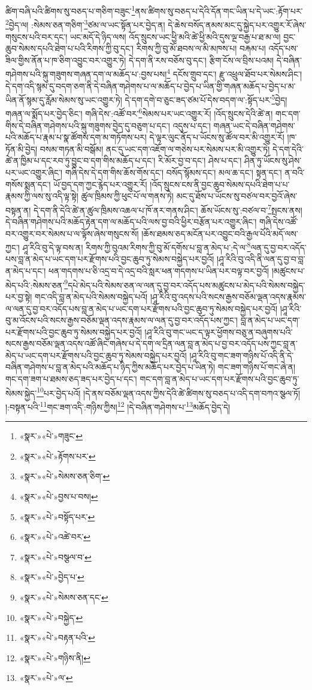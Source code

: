 ཚིག་བཞི་པའི་ཚིགས་སུ་བཅད་པ་གཅིག་བཟུང་\footnote{«སྣར་»«པེ་»གཟུང་}ནས་ཚིགས་སུ་བཅད་པ་དེའི་དོན་གང་ཡིན་པ་དེ་ཡང་:རྟོག་པར་\footnote{«སྣར་»«པེ་»རྟོགས་པར་}བྱེད་ལ། :སེམས་ཅན་གཅིག་\footnote{«སྣར་»«པེ་»སེམས་ཅན་ཅིག་}ཙམ་ལ་ཡང་སྟོན་པར་བྱེད་ན། དེ་ཆེས་བསོད་ནམས་མང་དུ་སྐྱེད་པར་འགྱུར་རོ་ཞེས་གསུངས་པའི་བར་དང་། ཡང་མདོ་དེ་ཉིད་ལས། འོད་སྲུངས་ཡང་ཕྱི་མའི་ཚེ་ཕྱི་མའི་དུས་ལྔ་བརྒྱ་པ་ཐ་མ་ལ། བྱང་ཆུབ་སེམས་དཔའི་ཐེག་པ་པའི་རིགས་ཀྱི་བུ་དང་། རིགས་ཀྱི་བུ་མོ་ཐབས་ལ་མི་མཁས་པ། བརྐམ་པ། འདོད་པས་ཟིལ་གྱིས་ནོན་པ་ཁ་ཅིག་འབྱུང་བར་འགྱུར་ཏེ། དེ་དག་ནི་རས་བཅོས་བུ་དང་། རྩིག་ངོས་ལ་བྲིས་པའམ། དེ་བཞིན་གཤེགས་པའི་སྐུ་གཟུགས་གཞན་དག་ལ་མཆོད་པ་:བྱས་པས།\footnote{«སྣར་»«པེ་»བྱས་པ་བས།} དངོས་གྲུབ་དང་། རྫུ་འཕྲུལ་ཐོབ་པར་སེམས་ཤིང་། དེ་དག་འདི་སྙམ་དུ་བདག་ཅག་ནི་དེ་བཞིན་གཤེགས་པ་ལ་མཆོད་པ་བྱེད་པ་ཡིན་གྱི་གཞན་མཆོད་པ་བྱེད་པ་མ་ཡིན་ནོ་སྙམ་དུ་རློམ་སེམས་སུ་ཡང་འགྱུར་ཏེ། དེ་དག་དགེ་བ་ཅུང་ཟད་ཙམ་པོ་དེས་བདག་ལ་:སྟོད་པར་\footnote{«སྣར་»«པེ་»བསྟོད་པར་}བྱེད། གཞན་ལ་སྨོད་པར་བྱེད་ཅིང་། གཞི་དེས་:འཚོ་བར་\footnote{«སྣར་»«པེ་»འཚེ་བར་}སེམས་པར་ཡང་འགྱུར་རོ། །འོད་སྲུངས་དེའི་ཚེ་ན། གང་དག་གིས་དེ་བཞིན་གཤེགས་པའི་སྐུ་གཟུགས་བྱེད་དུ་བཅུག་པ་དང་། འདུས་པ་དང་། གཞན་ཡང་དེ་བཞིན་གཤེགས་པའི་མཆོད་པ་རྣམ་པ་སྣ་ཚོགས་དག་མ་གཏོགས་པར། དེ་ལྟར་ལུང་ནོད་པ་ཡོངས་སུ་ཚོལ་བར་མི་འགྱུར་རོ། །ཁ་ཏོན་མི་བྱེད། བསམ་གཏན་མི་བསྒོམ། ནང་དུ་ཡང་དག་འཇོག་ལ་གཅེས་པར་སེམས་པར་མི་འགྱུར་ཏེ། དེ་དག་དེའི་ཚེ་ན་ཁྱིམ་པ་དང་རབ་ཏུ་བྱུང་བ་དག་གིས་མཆོད་པ་དང་། རི་མོར་བྱ་བ་དང་། ཤེས་པ་དང་། ཤིན་ཏུ་ཡོངས་སུ་ཤེས་པར་ཡང་འགྱུར་ཞིང་། གཞི་དེས་དེ་དག་གིས་ཆོས་གོས་དང་། བསོད་སྙོམས་དང་། མལ་ཆ་དང་། སྟན་དང་། ན་བའི་གསོས་སྨན་དང་། ཡོ་བྱད་དག་ཀྱང་རྙེད་པར་འགྱུར་རོ། །འོད་སྲུངས་ངས་ནི་བྱང་ཆུབ་སེམས་དཔའི་ཐེག་པ་པ་རྣམས་ཀྱི་ལས་སུ་འདི་ལྟ་སྟེ། ཚུལ་ཁྲིམས་ཀྱི་ཕུང་པོ་ལ་གནས་ཏེ། མང་དུ་ཐོས་པ་ཡོངས་སུ་བཙལ་བར་བྱའོ་ཞེས་བསྟན་ན། དེ་དག་ནི་དེའི་ཚེ་ན་ཚུལ་ཁྲིམས་འཆལ་པ་ཁོ་ནར་གནས་ཤིང་། ཆོས་ཡོངས་སུ་:བཙལ་བ་\footnote{«སྣར་»«པེ་»བསྩལ་བ་}སྤངས་ནས། དེ་བཞིན་གཤེགས་པའི་མཆོད་རྟེན་དག་ལ་མཆོད་པའི་ལས་བྱ་བའི་ཕྱིར་བརྩོན་པར་འགྱུར་ཞིང་། གཞི་དེས་འཚོ་བར་འགྱུར་བར་སེམས་པ་ལ་ལྟོས་ཞེས་གསུངས་སོ། །ཆོས་ཐམས་ཅད་མངོན་པར་འབྱུང་བའི་རྒྱལ་པོའི་མདོ་ལས་ཀྱང་། ཤཱ་རིའི་བུ་དེ་ལྟ་བས་ན། རིགས་ཀྱི་བུའམ་རིགས་ཀྱི་བུ་མོ་དགོས་པ་བླ་ན་མེད་པ་:དེ་ལ་\footnote{«སྣར་»«པེ་»བྱེད་པ་}ལན་དུ་བྱ་བར་འདོད་པས་བླ་ན་མེད་པ་ཡང་དག་པར་རྫོགས་པའི་བྱང་ཆུབ་ཏུ་སེམས་བསྐྱེད་པར་བྱའོ། །ཤཱ་རིའི་བུ་འདི་ནི་ལན་དུ་བྱ་བ་བླ་ན་མེད་པ་དང་། ཕན་གདགས་པ་ཅི་འདྲ་བ་དེ་འདྲ་བའི་སླར་ཕན་གདགས་པ་ཡིན་པར་བལྟ་བར་བྱའོ། །མཚུངས་པ་མེད་པའི་:སེམས་ཅན་\footnote{«སྣར་»«པེ་»སེམས་ཅན་དང་}དཔེ་མེད་པའི་སེམས་ཅན་ལ་ལན་དུ་བྱ་བར་འདོད་པས་མཚུངས་པ་མེད་པའི་སེམས་བསྐྱེད་པར་བྱ་སྟེ། གང་འདི་བླ་ན་མེད་པའི་སེམས་བསྐྱེད་པའོ། །ཤཱ་རིའི་བུ་འདས་པའི་སངས་རྒྱས་བཅོམ་ལྡན་འདས་རྣམས་ལ་ལན་དུ་བྱ་བར་འདོད་པས་བླ་ན་མེད་པ་ཡང་དག་པར་རྫོགས་པའི་བྱང་ཆུབ་ཏུ་སེམས་བསྐྱེད་པར་བྱའོ། །ཤཱ་རིའི་བུ་མ་འོངས་པའི་སངས་རྒྱས་བཅོམ་ལྡན་འདས་རྣམས་ལ་ལན་དུ་བྱ་བར་འདོད་པས་ཀྱང་། བླ་ན་མེད་པ་ཡང་དག་པར་རྫོགས་པའི་བྱང་ཆུབ་ཏུ་སེམས་བསྐྱེད་པར་བྱའོ། །ཤཱ་རིའི་བུ་གང་ཡང་ད་ལྟར་ཕྱོགས་བཅུ་ན་བཞུགས་པའི་སངས་རྒྱས་བཅོམ་ལྡན་འདས་འཚོ་ཞིང་གཞེས་པ་དེ་དག་ལ་དྲིན་ལན་བླ་ན་མེད་པ་བྱ་བར་འདོད་པས་ཀྱང་བླ་ན་མེད་པ་ཡང་དག་པར་རྫོགས་པའི་བྱང་ཆུབ་ཏུ་སེམས་བསྐྱེད་པར་བྱའོ། །ཤཱ་རིའི་བུ་གང་ཟག་གཉིས་པོ་འདི་ནི་དེ་བཞིན་གཤེགས་པ་བླ་ན་མེད་པའི་མཆོད་པ་ཉིད་ཀྱིས་མཆོད་པར་བྱེད་པ་ཡིན་ཏེ། གང་ཟག་གཉིས་པོ་གང་ཞེ་ན། གང་དག་ཟག་པ་ཐམས་ཅད་ཟད་པར་བྱེད་པ་དང་། གང་དག་བླ་ན་མེད་པ་ཡང་དག་པར་རྫོགས་པའི་བྱང་ཆུབ་ཏུ་སེམས་སྐྱེད་\footnote{«སྣར་»«པེ་»བསྐྱེད་}པར་བྱེད་པའོ། །དེ་ནས་བཅོམ་ལྡན་འདས་ཀྱིས་དེའི་ཚེ་ཚིགས་སུ་བཅད་པ་འདི་དག་བཀའ་སྩལ་ཏོ། །:བསྟན་པའི་\footnote{«སྣར་»«པེ་»བརྟན་པའི་}གང་ཟག་འདི་:གཉིས་ཀྱིས།\footnote{«སྣར་»«པེ་»གཉིས་ནི།} །དེ་བཞིན་གཤེགས་པ་\footnote{«སྣར་»«པེ་»ལ་}མཆོད་བྱེད་དེ། 